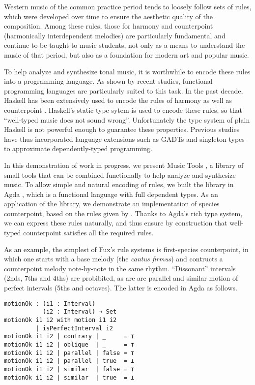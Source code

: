 \documentclass[sigplan,review]{acmart}\settopmatter{printfolios=true,printccs=false,printacmref=false}
\begin{document}
Western music of the common practice period tends to loosely
follow sets of rules, which were developed over time to ensure
the aesthetic quality of the composition. 
Among these rules, those for harmony \citep{piston1987harmony}
and counterpoint (harmonically interdependent
melodies) \citep{fux1965study} are particularly fundamental and continue
to be taught to music students,
not only as a means to understand the music of that period, but
also as a foundation for modern art and popular music.

To help analyze and synthesize tonal music, it is worthwhile to
encode these rules into a programming language. As shown by
recent studies, functional programming languages are particularly
suited to this task.
In the past decade, Haskell has been extensively used to encode
the rules of harmony \citep{fmmh, hihseufha, faamh, hafha, fghm}
as well as counterpoint \citep{szamozvancev2017well}.
Haskell's static type sytem is used to encode these rules, so that
``well-typed music does not sound wrong''.
Unfortunately the type system of plain Haskell
is not powerful enough to guarantee these properties. Previous studies
have thus incorporated language extensions such as GADTs 
\citep{cheney2002lightweight} and singleton types 
\citep{eisenberg2013dependently} to approximate dependently-typed 
programming.

In this demonstration of work in progress, we present Music Tools
\citep{MusicTools}, a library of small tools that can be combined
functionally to help analyze and synthesize music.
To allow simple and natural encoding of rules, we built the library
in Agda \citep{norellphd}, which is a functional language with full
dependent types.
As an application of the library, we demonstrate an implementation of 
species counterpoint, based on the rules given by \citet{fux1965study}.
Thanks to Agda's rich type system, we can express 
these rules naturally, and thus ensure by construction that
well-typed counterpoint satisfies all the required rules.

As an example, the simplest of Fux's rule systems is first-species
counterpoint, in which one starts with a base melody (the \textit{cantus firmus})
and contructs a counterpoint melody note-by-note in the same rhythm.
``Dissonant'' intervals (2nds, 7ths and 4ths) are probibited, as are
are parallel and similar motion of perfect intervals (5ths and octaves).
The latter is encoded in Agda as follows.

\begin{lstlisting}
motionOk : (i1 : Interval)
           (i2 : Interval) → Set
motionOk i1 i2 with motion i1 i2
         | isPerfectInterval i2
motionOk i1 i2 | contrary | _     = ⊤
motionOk i1 i2 | oblique  | _     = ⊤
motionOk i1 i2 | parallel | false = ⊤
motionOk i1 i2 | parallel | true  = ⊥
motionOk i1 i2 | similar  | false = ⊤
motionOk i1 i2 | similar  | true  = ⊥
\end{lstlisting}
\end{document}
